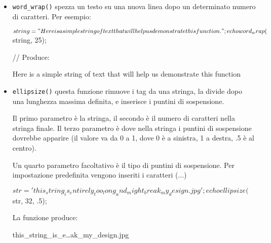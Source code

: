 \begin{itemize}

\item \verb|word_wrap()| spezza un testo su una nuova linea dopo un determinato numero di caratteri. Per esempio:

\begin{code}
$string = "Here is a simple string of text that will help us demonstrate this function.";

echo word_wrap($string, 25);

// Produce:

Here is a simple string
of text that will help
us demonstrate this
function
\end{code}

\item \verb|ellipsize()| questa funzione rimuove i tag da una stringa, la divide dopo una lunghezza massima definita, e inserisce i puntini di sospensione.

Il primo parametro è la stringa, il secondo è il numero di caratteri nella stringa finale. Il terzo parametro è dove nella stringa i puntini di sospensione dovrebbe apparire (il valore va da 0 a 1, dove 0 è a sinistra, 1 a destra, .5 è al centro).

Un quarto parametro facoltativo è il tipo di puntini di sospensione. Per impostazione predefinita vengono inseriti i caratteri  (...)

\begin{code}
$str = 'this_string_is_entirely_too_long_and_might_break_my_design.jpg';

echo ellipsize($str, 32, .5);
\end{code}

La funzione produce:

\begin{code}
this_string_is_e…ak_my_design.jpg
\end{code}

\end{itemize}
